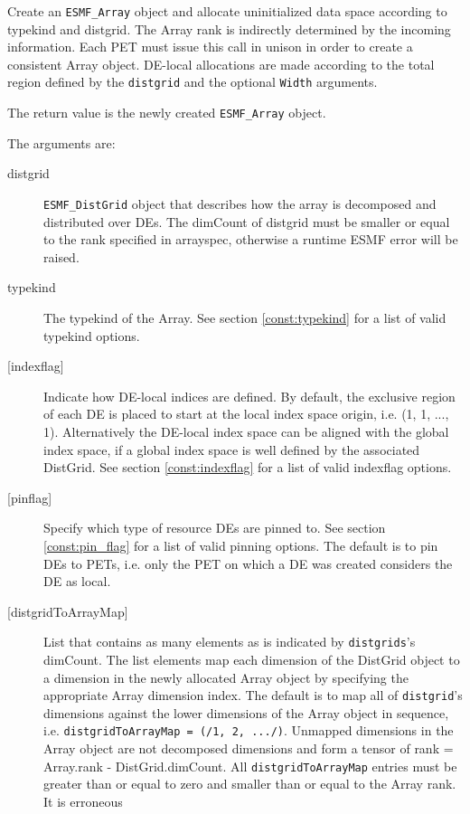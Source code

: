   Create an {\tt ESMF\_Array} object and allocate uninitialized data space
   according to typekind and distgrid. The Array rank is indirectly determined
   by the incoming information. Each PET must issue this call in unison in order
   to create a consistent Array object. DE-local allocations are made according
   to the total region defined by the {\tt distgrid} and the optional {\tt Width}
   arguments.
  
   The return value is the newly created {\tt ESMF\_Array} object.
  
   The arguments are:
   \begin{description}
   \item[distgrid]
   {\tt ESMF\_DistGrid} object that describes how the array is decomposed and
   distributed over DEs. The dimCount of distgrid must be smaller or equal
   to the rank specified in arrayspec, otherwise a runtime ESMF error will be
   raised.
   \item[typekind]
   The typekind of the Array. See section \ref{const:typekind}
   for a list of valid typekind options.
   \item[{[indexflag]}]
   Indicate how DE-local indices are defined. By default, the exclusive
   region of each DE is placed to start at the local index space origin,
   i.e. (1, 1, ..., 1). Alternatively the DE-local index space can be
   aligned with the global index space, if a global index space is well
   defined by the associated DistGrid. See section \ref{const:indexflag}
   for a list of valid indexflag options.
   \item[{[pinflag]}]
   Specify which type of resource DEs are pinned to. See section
   \ref{const:pin_flag} for a list of valid pinning options.
   The default is to pin DEs to PETs, i.e. only the PET on which a DE
   was created considers the DE as local.
   \item[{[distgridToArrayMap]}]
   List that contains as many elements as is indicated by
   {\tt distgrids}'s dimCount. The list elements map each dimension of
   the DistGrid object to a dimension in the newly allocated Array object
   by specifying the appropriate Array dimension index. The default is
   to map all of {\tt distgrid}'s dimensions against the lower dimensions
   of the Array object in sequence, i.e. {\tt distgridToArrayMap =
   (/1, 2, .../)}.
   Unmapped dimensions in the Array object are not decomposed dimensions
   and form a tensor of rank = Array.rank - DistGrid.dimCount.
   All {\tt distgridToArrayMap} entries must be greater than or equal
   to zero and smaller than or equal to the Array rank. It is erroneous

\end{description}
